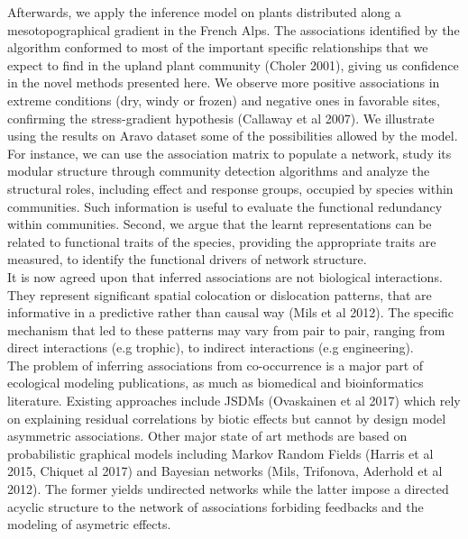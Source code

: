 \documentclass[]{article}
\begin{document}
\noindent Afterwards, we apply the inference model on plants distributed along a mesotopographical gradient in the French Alps. The associations identified by the algorithm conformed to most of the important specific relationships that we expect to find in the upland plant community (Choler 2001), giving us confidence in the novel methods presented here. We observe more positive associations in extreme conditions (dry, windy or frozen) and negative ones in favorable sites, confirming the stress-gradient hypothesis (Callaway et al 2007). We illustrate using the results on Aravo dataset some of the possibilities allowed by the model. For instance, we can use the association matrix to populate a network, study its modular structure through community detection algorithms and analyze the structural roles, including effect and response groups, occupied by species within communities. Such information is useful to evaluate the functional redundancy within communities. Second, we argue that the learnt representations can be related to functional traits of the species, providing the appropriate traits are measured, to identify the functional drivers of network structure. \\

\noindent It is now agreed upon that inferred associations are not biological interactions. They represent significant spatial colocation or dislocation patterns, that are informative in a predictive rather than causal way (Mils et al 2012). The specific mechanism that led to these patterns may vary from pair to pair, ranging from direct interactions (e.g trophic), to indirect interactions (e.g engineering). \\

\noindent The problem of inferring associations from co-occurrence is a major part of ecological modeling publications, as much as biomedical and bioinformatics literature. Existing approaches include JSDMs (Ovaskainen et al 2017) which rely on explaining residual correlations by biotic effects but cannot by design model asymmetric associations. Other major state of art methods are based on probabilistic graphical models including Markov Random Fields (Harris et al 2015, Chiquet al 2017) and Bayesian networks (Mils, Trifonova, Aderhold et al 2012). The former yields undirected networks while the latter impose a directed acyclic structure to the network of associations forbiding feedbacks and the modeling of asymetric effects. \\
\end{document}
